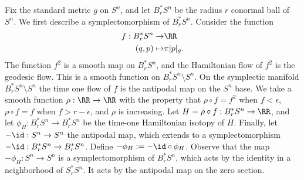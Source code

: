 

    Fix the standard metric $g$ on $S^n$, and let $B_r^*S^{n}$ be the radius  $r$ conormal ball of $S^n$. 
    We first describe a symplectomorphism of $B_r^*S^n$.
    Consider the function 
    \begin{align*}
        f: B_r^*S^{n}\to& \RR\\
        (q, p) \mapsto& \pi|p|_g.
    \end{align*}
    The function $f^2$ is a smooth map on $B_r^*S^n$, and the Hamiltonian flow of $f^2$ is the geodesic flow. 
    This is a smooth function on $B^*_rS^n\setminus S^n$. 
    On the symplectic manifold $B^*_rS^n\setminus S^n$ the time one flow of $f$ is the antipodal map on the $S^n$ base. 
    We take a smooth function $\rho: \RR\to \RR$ with the property that $\rho \circ f = f^2$ when $f< \epsilon$, $\rho\circ f=f$ when $f>r-\epsilon$, and $\rho$ is increasing. 
    Let $H= \rho \circ f: B^*_rS^n\to \RR$, and let $\phi_H: B_r^*S^n\to B_r^*S^n$ be the time-one Hamiltonian isotopy of $H$. 
    Finally, let $-\id: S^n\to S^n$ the antipodal map, which extends to a symplectomorphism $-\id: B_r^*S^n\to B_r^*S^n$. 
    Define $-\phi_H:=-\id\circ \phi_H$. 
    Observe that the map $-\phi_H: S^n\to S^n$ is a symplectomorphism of $B_r^*{S^n}$, which acts by the identity in a neighborhood of $S_r^*S^{n}$.
    It acts by the antipodal map on the zero section.
